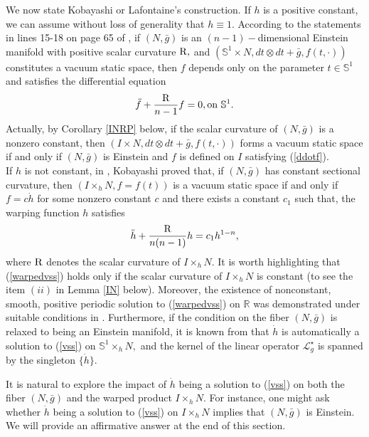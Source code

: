 \documentclass[10pt,leqno,oneside]{amsart}
\begin{document}
{             We now state Kobayashi or Lafontaine's construction. If $h$ is a positive constant, we can assume without loss of generality that \(h\equiv 1\). According to the statements in lines 15-18 on page 65 of \cite{Lafontaine1983}, if $(N, \bar{g})$ is an $(n-1)-$dimensional Einstein manifold with positive scalar curvature ${\rm{R}},$ and $(\mathbb{S}^1\times N, dt\otimes dt+\bar{g}, f(t,\cdot))$ constitutes a vacuum static space, then $f$ depends only on the parameter $t\in \mathbb{S}^1$ and satisfies the differential equation
             \begin{equation}\label{ddotf}
               \ddot{f}+\frac{{\rm{R}}}{n-1}f=0, \text{on~} \mathbb{S}^1.
             \end{equation}
             Actually, by Corollary \ref{INRP} below, if the scalar curvature of $(N, \bar{g})$ is a nonzero constant, then $(I\times N, dt\otimes dt+\bar{g}, f(t,\cdot))$ forms a vacuum static space if and only if $(N , \bar{g})$ is Einstein and $f$ is defined on $I$ satisfying (\ref{ddotf}).  \\
             If $h$ is not constant, in \cite[Lemma 1.1]{Kobayashi1982}, Kobayashi proved that, if $(N , \bar{g})$ has constant sectional curvature, then $(I\times_hN , f=f(t))$ is a vacuum static space if and only if $f=c\dot{h}$ for some nonzero constant $c$ and there exists a constant $c_1$ such that, the warping function $h$ satisfies
     \begin{equation}\label{warpedvss}
             \ddot{h}+\frac{{\rm{R}}}{n(n-1)}h=c_1h^{1-n},
     \end{equation}
             where ${\rm{R}}$ denotes the scalar curvature of $I\times_hN .$ It is worth highlighting that (\ref{warpedvss}) holds only if the scalar curvature of $I\times_h N $ is constant (to see the item $(ii)$ in Lemma \ref{IN} below). Moreover, the existence of nonconstant, smooth, positive periodic solution to (\ref{warpedvss}) on $\mathbb{R}$ was demonstrated under suitable conditions in \cite[Proposition 2.6]{Kobayashi1982}. Furthermore, if the condition on the fiber $(N, \bar{g})$ is relaxed to being an Einstein manifold, it is known from \cite[Lemma C3]{Lafontaine1983} that $\dot{h}$ is automatically a solution to (\ref{vss}) on $\mathbb{S}^1\times_h N,$ and the kernel of the linear operator $\mathcal{L}_g^{\star}$ is spanned by the singleton $\{\dot{h}\}.$

             It is natural to explore the impact of \(\dot{h}\) being a solution to (\ref{vss}) on both the fiber \((N ,\bar{g})\) and the warped product \(I\times_h N \). For instance, one might ask whether $\dot{h}$ being a solution to (\ref{vss}) on $I\times_h N $ implies that $(N , \bar{g})$ is Einstein. We will provide an affirmative answer at the end of this section.

}
\end{document}
